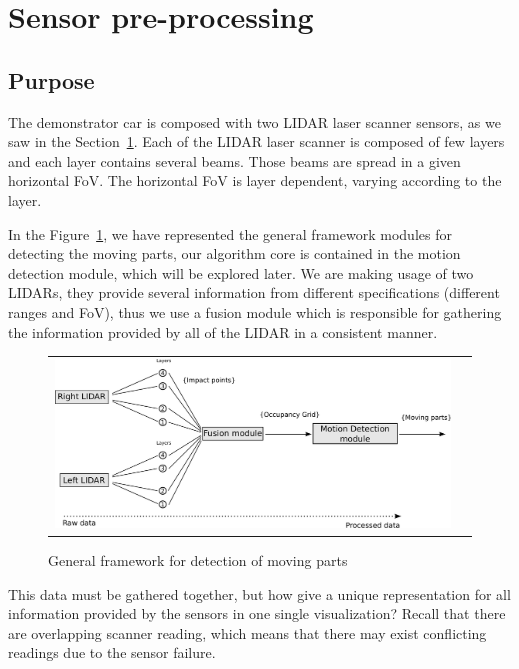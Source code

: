 \section{Sensor pre-processing} %
\label{sec:sensor:fusion}


\subsection{Purpose}

The demonstrator car is composed with two LIDAR laser scanner sensors, as we saw in the Section~\ref{sec:sensor:fusion}. Each of the LIDAR laser scanner is composed of few layers and each layer contains several beams. Those beams are spread in a given horizontal FoV. The horizontal FoV is layer dependent, varying according to the layer.

In the Figure~\ref{fig:motion:framework}, we have represented the general framework modules for detecting the moving parts, our algorithm core is contained in the motion detection module, which will be explored later. We are making usage of two LIDARs, they provide several information from different specifications (different ranges and FoV), thus we use a fusion module which is responsible for gathering the information provided by all of the LIDAR in a consistent manner.

\begin{figure}[h]
   \centering
     \begin{tabular}{lr}
       \includegraphics[scale=0.30]{img/fig:motion:framework}
     \end{tabular}
   \caption{General framework for detection of moving parts}
   \label{fig:motion:framework}
\end{figure}

This data must be gathered together, but how give a unique representation for all information provided by the sensors in one single visualization? Recall that there are overlapping scanner reading, which means that there may exist conflicting readings due to the sensor failure.

